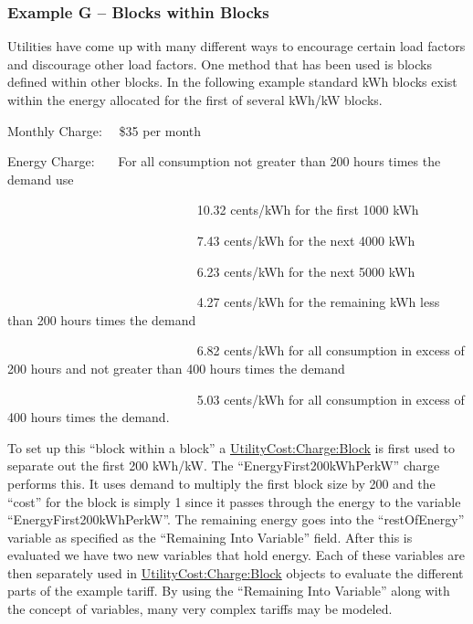 \subsubsection{Example G -- Blocks within Blocks}\label{example-g-blocks-within-blocks}

Utilities have come up with many different ways to encourage certain load factors and discourage other load factors. One method that has been used is blocks defined within other blocks. In the following example standard kWh blocks exist within the energy allocated for the first of several kWh/kW blocks.

Monthly Charge:~~ \$35 per month

Energy Charge:~~~ For all consumption not greater than 200 hours times the demand use

~~~~~~~~~~~~~~~~~~~~~~~~~~~~~ 10.32 cents/kWh for the first 1000 kWh

~~~~~~~~~~~~~~~~~~~~~~~~~~~~~ 7.43 cents/kWh for the next 4000 kWh

~~~~~~~~~~~~~~~~~~~~~~~~~~~~~ 6.23 cents/kWh for the next 5000 kWh

~~~~~~~~~~~~~~~~~~~~~~~~~~~~~ 4.27 cents/kWh for the remaining kWh less than 200 hours times the demand

~~~~~~~~~~~~~~~~~~~~~~~~~~~~~ 6.82 cents/kWh for all consumption in excess of 200 hours and not greater than 400 hours times the demand

~~~~~~~~~~~~~~~~~~~~~~~~~~~~~ 5.03 cents/kWh for all consumption in excess of 400 hours times the demand.

To set up this ``block within a block'' a \hyperref[utilitycostchargeblock]{UtilityCost:Charge:Block} is first used to separate out the first 200 kWh/kW. The ``EnergyFirst200kWhPerkW'' charge performs this. It uses demand to multiply the first block size by 200 and the ``cost'' for the block is simply 1 since it passes through the energy to the variable ``EnergyFirst200kWhPerkW''. The remaining energy goes into the ``restOfEnergy'' variable as specified as the ``Remaining Into Variable'' field. After this is evaluated we have two new variables that hold energy. Each of these variables are then separately used in \hyperref[utilitycostchargeblock]{UtilityCost:Charge:Block} objects to evaluate the different parts of the example tariff. By using the ``Remaining Into Variable'' along with the concept of variables, many very complex tariffs may be modeled.

